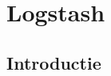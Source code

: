 

\chapter{Logstash}
\label{ch:logstash}


\section{Introductie}
\label{sec:logstash-introductie}


